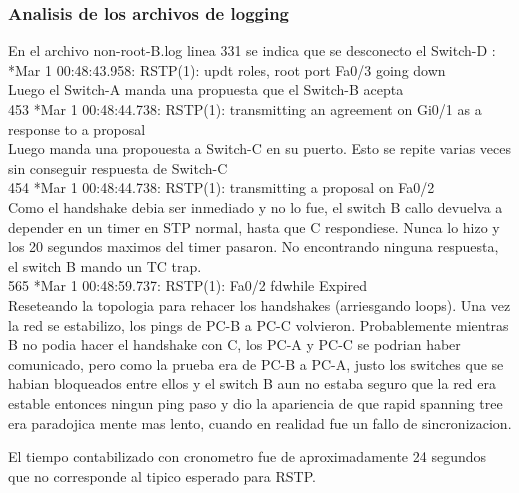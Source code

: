 \subsubsection*{Analisis de los archivos de logging}
En el archivo non-root-B.log linea 331 se indica que se desconecto el Switch-D : \\
*Mar  1 00:48:43.958: RSTP(1): updt roles, root port Fa0/3 going down\\
Luego el Switch-A manda una propuesta que el Switch-B acepta\\
453 *Mar  1 00:48:44.738: RSTP(1): transmitting an agreement on Gi0/1 as a response to a proposal\\
Luego manda una propouesta a Switch-C en su puerto. Esto se repite varias veces sin conseguir respuesta de Switch-C\\
454 *Mar  1 00:48:44.738: RSTP(1): transmitting a proposal on Fa0/2\\
Como el handshake debia ser inmediado y no lo fue, el switch B callo devuelva a depender en un timer en STP normal,
hasta que C respondiese. Nunca lo hizo y los 20 segundos maximos del timer pasaron. No encontrando ninguna respuesta, 
el switch B mando un TC trap.\\
565 *Mar  1 00:48:59.737: RSTP(1): Fa0/2 fdwhile Expired\\
Reseteando la topologia para rehacer los handshakes (arriesgando loops). Una vez la red se estabilizo, los pings de PC-B a PC-C volvieron.
Probablemente mientras B no podia hacer el handshake con C, los PC-A y PC-C se podrian haber comunicado, pero como la prueba era de PC-B a
 PC-A, justo los switches que se habian bloqueados entre ellos y el switch B aun no estaba seguro que la red era estable entonces ningun
  ping paso y dio la apariencia de que rapid spanning tree era paradojica mente mas lento, cuando en realidad fue un fallo de sincronizacion.

El tiempo contabilizado con cronometro fue de aproximadamente 24 segundos que no corresponde al tipico esperado para RSTP.

